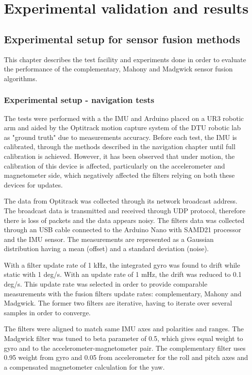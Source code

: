 \chapter{Experimental validation and results}
\section{Experimental setup for sensor fusion methods}

This chapter describes the test facility and experiments done in order to evaluate the performance of the complementary, Mahony and Madgwick sensor fusion algorithms.

\subsection{Experimental setup - navigation tests}

The tests were performed with a the IMU and Arduino placed on a UR3 robotic arm and aided by the Optitrack motion capture system of the DTU robotic lab as "ground truth" due to measurements accuracy. 
Before each test, the IMU is calibrated, through the methods described in the navigation chapter until full calibration is achieved. However, it has been observed that under motion, the calibration of this device is affected, particularly on the accelerometer and magnetometer side, which negatively affected the filters relying on both these devices for updates. 

The data from Optitrack was collected through its network broadcast address. The broadcast data is transmitted and received through UDP protocol, therefore there is loss of packets and the data appears noisy. 
The filters data was collected through an USB cable connected to the Arduino Nano with SAMD21 processor and the IMU sensor. The measurements are represented as a Gaussian distribution having a mean (offset) and a standard deviation (noise). 

With a filter update rate of 1 kHz, the integrated gyro was found to drift while static with 1 deg/s. With an update rate of 1 mHz, the drift was reduced to 0.1 deg/s. This update rate was selected in order to provide comparable measurements with the fusion filters update rates: complementary, Mahony and Madgwick. The former two filters are iterative, having to iterate over several samples in order to converge. 

The filters were aligned to match same IMU axes and polarities and ranges. The Madgwick filter was tuned to beta parameter of 0.5, which gives equal weight to gyro and to the accelerometer-magnetometer pair. The complementary filter uses 0.95 weight from gyro and 0.05 from accelerometer for the roll and pitch axes and a compensated magnetometer calculation for the yaw. 



